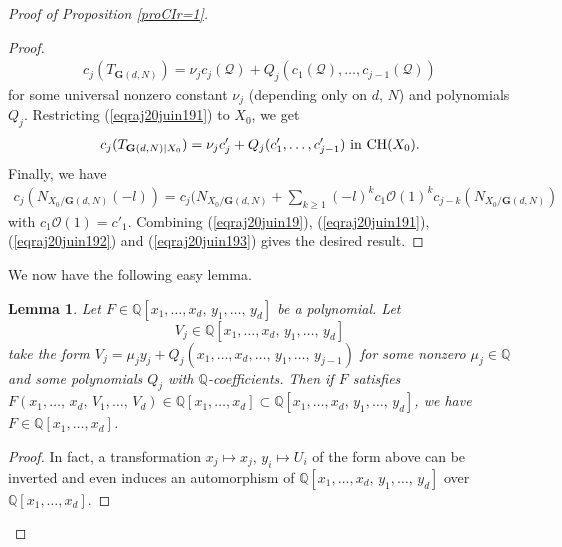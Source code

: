 \documentclass[10pt]{article}
\newtheorem{lemm}[theo]{Lemma}
\begin{document}
\begin{proof}[Proof of Proposition \ref{proCIr=1}]
\begin{proof}
\begin{eqnarray}\label{eqraj20juin191}c_j(T_{\mathbf{G}(d,N)})=\nu_j c_j(\mathcal{Q}) +Q_j(c_1(\mathcal{Q}),\ldots,c_{j-1}(\mathcal{Q}))\end{eqnarray} for some
 universal nonzero constant
$\nu_j$ (depending only on $d,\,N$)  and polynomials $Q_j$.  Restricting (\ref{eqraj20juin191}) to $X_0$,
we get
\begin{eqnarray}\label{eqraj20juin192}c_j(T_{\mathbf{G}(d,N)\mid X_0})=\nu_j c'_j +Q_j(c'_1,\ldots,c'_{j-1})\,\,{\rm in}\,\,{\rm CH}(X_0).\end{eqnarray}
Finally, we have
\begin{eqnarray}\label{eqraj20juin193}c_j(N_{X_0/\mathbf{G}(d,N)}(-l))=c_j(N_{X_0/\mathbf{G}(d,N)}+\sum_{k\geq 1}(-l)^kc_1\mathcal{O}(1)^kc_{j-k}(N_{X_0/\mathbf{G}(d,N)})
\end{eqnarray}
with  $c_1\mathcal{O}(1)=c'_1$. Combining (\ref{eqraj20juin19}), (\ref{eqraj20juin191}), (\ref{eqraj20juin192}) and (\ref{eqraj20juin193}) gives the desired result.
\end{proof}
 We now have the following easy lemma.
 \begin{lemm} \label{letresfacileconst}Let  $F\in \mathbb{Q}[x_1,\ldots,x_d,\,y_1,\ldots,\,y_d]$
 be a polynomial. Let
 $$V_j\in \mathbb{Q}[x_1,\ldots,x_d,\,y_1,\ldots,\,y_d]$$  take the form
 $V_j=\mu_j y_j +Q_j(x_1,\ldots,x_d,\ldots,\,y_1,\ldots,\, y_{j-1})$ for some nonzero $\mu_j\in\mathbb{Q}$ and some polynomials $Q_j$ with $\mathbb{Q}$-coefficients.
 Then if $F$ satisfies $F(x_1,\ldots,\,x_d,\,V_1,\ldots,\,V_d)\in \mathbb{Q}[x_1,\ldots,x_d]\subset \mathbb{Q}[x_1,\ldots,x_d,\,y_1,\ldots,\,y_d]$,
 we have $F\in \mathbb{Q}[x_1,\ldots,x_d]$.
 \end{lemm}
\begin{proof} In fact, a transformation $x_j\mapsto x_j,\,y_i\mapsto U_i$ of the form above can be inverted and even induces an automorphism of $\mathbb{Q}[x_1,\ldots,x_d,\,y_1,\ldots,\,y_d]$ over $\mathbb{Q}[x_1,\ldots,x_d]$.
\end{proof}


\end{proof}
\end{document}
